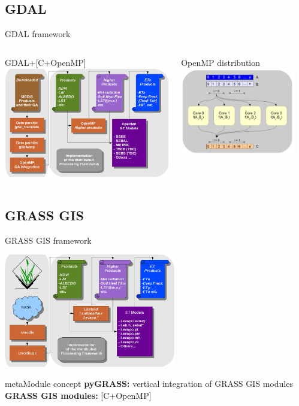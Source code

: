\documentclass[xcolor=dvipsnames,beamer]{beamer} %
\begin{document}
\subsection{GDAL}
\begin{frame}[fragile]{GDAL framework}

\begin{columns}[l]
\begin{center}
 GDAL+[C+OpenMP]
 \includegraphics[width=7.5cm]{chain2}
\end{center}
\begin{center}
 OpenMP distribution
 \includegraphics[width=5cm]{chain1}
\end{center}
\end{columns}
\end{frame}


\subsection{GRASS GIS}
\begin{frame}[fragile]{GRASS GIS framework}

\begin{center}
 \includegraphics[width=7.5cm]{architecture_implementation}
\end{center}

\begin{block}{metaModule concept}
{\bf pyGRASS:} vertical integration of GRASS GIS modules\\
{\bf GRASS GIS modules:} [C+OpenMP]
\end{block}

\end{frame}
\end{document}
